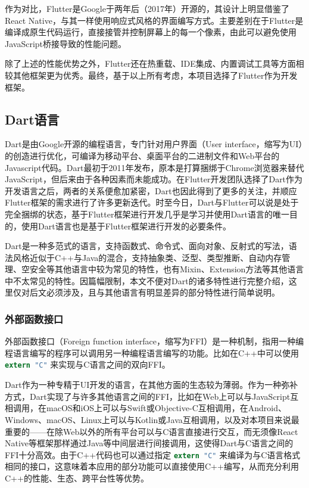 作为对比，Flutter是Google于两年后（2017年）开源的，其设计上明显借鉴了React Native，与其一样使用响应式风格的界面编写方式。主要差别在于Flutter是编译成原生代码运行，直接接管并控制屏幕上的每一个像素，由此可以避免使用JavaScript桥接导致的性能问题。

除了上述的性能优势之外，Flutter还在热重载、IDE集成、内置调试工具等方面相较其他框架更为优秀。最终，基于以上所有考虑，本项目选择了Flutter作为开发框架。

\subsection{Dart语言}\label{subsec:dart}

Dart是由Google开源的编程语言，专门针对用户界面（User interface，缩写为UI）的创造进行优化，可编译为移动平台、桌面平台的二进制文件和Web平台的Javascript代码\cite{DartProgrammingLanguage}。Dart最初于2011年发布，原本是打算捆绑于Chrome浏览器来替代JavaScript，但后来由于各种因素而未能成功。在Flutter开发团队选择了Dart作为开发语言之后，两者的关系便愈加紧密，Dart也因此得到了更多的关注，并顺应Flutter框架的需求进行了许多更新迭代。时至今日，Dart与Flutter可以说是处于完全捆绑的状态，基于Flutter框架进行开发几乎是学习并使用Dart语言的唯一目的，使用Dart语言也是基于Flutter框架进行开发的必要条件。

Dart是一种多范式的语言，支持函数式、命令式、面向对象、反射式的写法，语法风格近似于C++与Java的混合，支持抽象类、泛型、类型推断、自动内存管理、空安全等其他语言中较为常见的特性，也有Mixin、Extension方法等其他语言中不太常见的特性。因篇幅限制，本文不便对Dart的诸多特性进行完整介绍，这里仅对后文必须涉及，且与其他语言有明显差异的部分特性进行简单说明。

\subsubsection{外部函数接口}\label{subsubsec:ffi}

外部函数接口（Foreign function interface，缩写为FFI）是一种机制，指用一种编程语言编写的程序可以调用另一种编程语言编写的功能。比如在C++中可以使用 \lstinline[language=C]{extern "C"} 来实现与C语言之间的双向FFI。

Dart作为一种专精于UI开发的语言，在其他方面的生态较为薄弱。作为一种弥补方式，Dart实现了与许多其他语言之间的FFI，比如在Web上可以与JavaScript互相调用，在macOS和iOS上可以与Swift或Objective-C互相调用，在Android、Windows、macOS、Linux上可以与Kotlin或Java互相调用，以及对本项目来说最重要的——在除Web以外的所有平台可以与C语言直接进行交互，而无须像React Native等框架那样通过Java等中间层进行间接调用，这使得Dart与C语言之间的FFI十分高效。由于C++代码也可以通过指定 \lstinline[language=C]{extern "C"} 来编译为与C语言格式相同的接口，这意味着本应用的部分功能可以直接使用C++编写，从而充分利用C++的性能、生态、跨平台性等优势。

